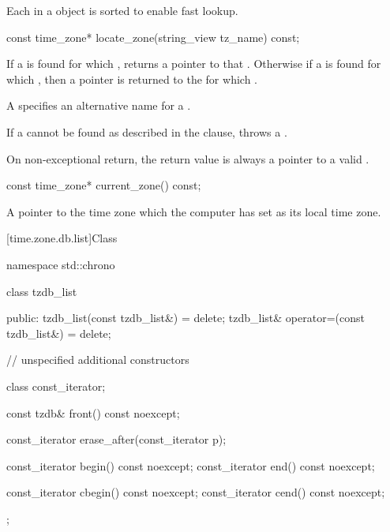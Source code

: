 \pnum
Each  in a  object
is sorted to enable fast lookup.

%
\begin{itemdecl}
const time_zone* locate_zone(string_view tz_name) const;
\end{itemdecl}

\begin{itemdescr}
\pnum
\returns
If a  is found
for which ,
returns a pointer to that .
Otherwise
if a  is found
for which ,
then a pointer is returned
to the  for which .
\begin{note}
A  specifies an alternative name for a .
\end{note}

\throws
If a  cannot be found
as described in the \returns clause,
throws a .
\begin{note}
On non-exceptional return, the return value is always a pointer to a valid .
\end{note}
\end{itemdescr}

%
\begin{itemdecl}
const time_zone* current_zone() const;
\end{itemdecl}

\begin{itemdescr}
\pnum
\returns
A pointer to the time zone which the computer has set as its local time zone.
\end{itemdescr}

[time.zone.db.list]{Class }

\begin{codeblock}
namespace std::chrono {
  class tzdb_list {
  public:
    tzdb_list(const tzdb_list&) = delete;
    tzdb_list& operator=(const tzdb_list&) = delete;

    // unspecified additional constructors

    class const_iterator;

    const tzdb& front() const noexcept;

    const_iterator erase_after(const_iterator p);

    const_iterator begin() const noexcept;
    const_iterator end()   const noexcept;

    const_iterator cbegin() const noexcept;
    const_iterator cend()   const noexcept;
  };
}
\end{codeblock}

